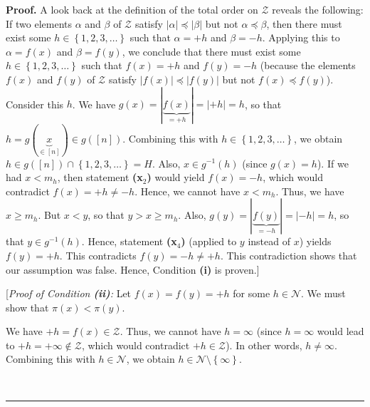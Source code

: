 \documentclass[numbers=enddot,12pt,final,onecolumn,notitlepage]{scrartcl}%
\theoremstyle{definition}
\newenvironment{proof}[1][Proof]{\noindent\textbf{#1.} }{\ \rule{0.5em}{0.5em}}
\newenvironment{verlong}{}{}
\begin{document}
\begin{verlong}
\begin{proof}
A look back at the definition of the total order on $\mathcal{Z}$ reveals the
following: If two elements $\alpha$ and $\beta$ of $\mathcal{Z}$ satisfy
$\left\vert \alpha\right\vert \preccurlyeq\left\vert \beta\right\vert $ but
not $\alpha\preccurlyeq\beta$, then there must exist some $h\in\left\{
1,2,3,\ldots\right\}  $ such that $\alpha=+h$ and $\beta=-h$. Applying this to
$\alpha=f\left(  x\right)  $ and $\beta=f\left(  y\right)  $, we conclude that
there must exist some $h\in\left\{  1,2,3,\ldots\right\}  $ such that
$f\left(  x\right)  =+h$ and $f\left(  y\right)  =-h$ (because the elements
$f\left(  x\right)  $ and $f\left(  y\right)  $ of $\mathcal{Z}$ satisfy
$\left\vert f\left(  x\right)  \right\vert \preccurlyeq\left\vert f\left(
y\right)  \right\vert $ but not $f\left(  x\right)  \preccurlyeq f\left(
y\right)  $). Consider this $h$. We have $g\left(  x\right)  =\left\vert
\underbrace{f\left(  x\right)  }_{=+h}\right\vert =\left\vert +h\right\vert
=h$, so that $h=g\left(  \underbrace{x}_{\in\left[  n\right]  }\right)  \in
g\left(  \left[  n\right]  \right)  $. Combining this with $h\in\left\{
1,2,3,\ldots\right\}  $, we obtain $h\in g\left(  \left[  n\right]  \right)
\cap\left\{  1,2,3,\ldots\right\}  =H$. Also, $x\in g^{-1}\left(  h\right)  $
(since $g\left(  x\right)  =h$). If we had $x<m_{h}$, then statement
\textbf{(x}$_{2}$\textbf{)} would yield $f\left(  x\right)  =-h$, which would
contradict $f\left(  x\right)  =+h\neq-h$. Hence, we cannot have $x<m_{h}$.
Thus, we have $x\geq m_{h}$. But $x<y$, so that $y>x\geq m_{h}$. Also,
$g\left(  y\right)  =\left\vert \underbrace{f\left(  y\right)  }%
_{=-h}\right\vert =\left\vert -h\right\vert =h$, so that $y\in g^{-1}\left(
h\right)  $. Hence, statement \textbf{(x}$_{4}$\textbf{)} (applied to $y$
instead of $x$) yields $f\left(  y\right)  =+h$. This contradicts $f\left(
y\right)  =-h\neq+h$. This contradiction shows that our assumption was false.
Hence, Condition \textbf{(i)} is proven.]

[\textit{Proof of Condition \textbf{(ii)}:} Let $f\left(  x\right)  =f\left(
y\right)  =+h$ for some $h\in\mathcal{N}$. We must show that $\pi\left(
x\right)  <\pi\left(  y\right)  $.

We have $+h=f\left(  x\right)  \in\mathcal{Z}$. Thus, we cannot have
$h=\infty$ (since $h=\infty$ would lead to $+h=+\infty\notin\mathcal{Z}$,
which would contradict $+h\in\mathcal{Z}$). In other words, $h\neq\infty$.
Combining this with $h\in\mathcal{N}$, we obtain
$h\in\mathcal{N}\setminus\left\{ \infty\right\}  $.


\end{proof}
\end{verlong}
\end{document}
